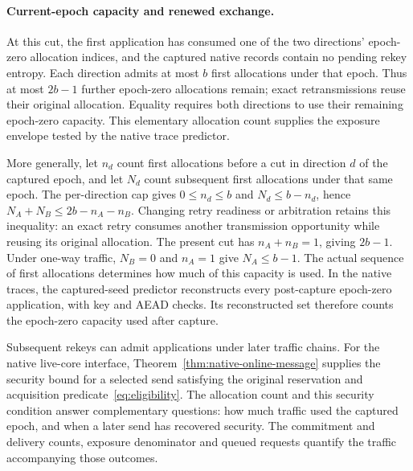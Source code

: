 \documentclass[pdflatex]{sn-jnl}
\theoremstyle{thmstyleone}
\theoremstyle{thmstylethree}
\theoremstyle{thmstyletwo}
\begin{document}
\paragraph{Current-epoch capacity and renewed exchange.}
At this cut, the first application has consumed one of the two directions'
epoch-zero allocation indices, and the captured native records contain no
pending rekey entropy. Each direction admits at most $b$ first allocations
under that epoch. Thus at most $2b-1$ further epoch-zero allocations remain;
exact retransmissions reuse their original allocation. Equality requires both
directions to use their remaining epoch-zero capacity. This elementary
allocation count supplies the exposure envelope tested by the native trace
predictor.

More generally, let $n_d$ count first allocations before a cut in direction
$d$ of the captured epoch, and let $N_d$ count subsequent first allocations
under that same epoch. The per-direction cap gives $0\le n_d\le b$ and
$N_d\le b-n_d$, hence $N_A+N_B\le2b-n_A-n_B$.
Changing retry readiness or arbitration retains this inequality: an exact
retry consumes another transmission opportunity while reusing its original
allocation. The present cut has $n_A+n_B=1$, giving $2b-1$.
Under one-way traffic, $N_B=0$ and $n_A=1$ give $N_A\le b-1$.
The actual sequence of first allocations determines how much of this
capacity is used. In the native traces, the captured-seed predictor reconstructs
every post-capture epoch-zero application, with key and AEAD checks. Its
reconstructed set therefore counts the epoch-zero capacity used after
capture.

Subsequent rekeys can admit applications under later traffic chains. For the
native live-core interface, Theorem~\ref{thm:native-online-message}
supplies the security bound for a selected send satisfying the original
reservation and acquisition predicate~\eqref{eq:eligibility}. The
allocation count and this security condition answer complementary
questions: how much traffic used the captured epoch, and when a later send
has recovered security. The commitment and delivery counts, exposure
denominator and queued requests quantify the traffic accompanying those
outcomes.
\end{document}
